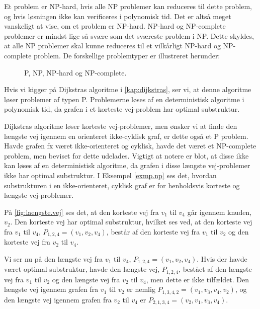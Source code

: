 Et problem er NP-hard, hvis alle NP problemer kan reduceres til dette problem, og hvis løsningen ikke kan verificeres i polynomisk tid. Det er altså meget vanskeligt at vise, om et problem er NP-hard. NP-hard og NP-complete problemer er mindst lige så svære som det sværeste problem i NP. Dette skyldes, at alle NP problemer skal kunne reduceres til et vilkårligt NP-hard og NP-complete problem.
De forskellige problemtyper er illustreret herunder:




\begin{figure}[H]
\centering
	\caption{P, NP, NP-hard og NP-complete.}
	\label{fig.dijkstraexmp}
\end{figure}

Hvis vi kigger på Dijkstras algoritme i \autoref{kap:dijkstras}, ser vi, at denne algoritme løser problemer af typen P. Problemerne løses af en deterministisk algoritme i polynomisk tid, da grafen i et korteste vej-problem har optimal substruktur.

Dijkstras algoritme løser korteste vej-problemer, men ønsker vi at finde den længste vej igennem en orienteret ikke-cyklisk graf, er dette også et P problem. Havde grafen fx været ikke-orienteret og cyklisk, havde det været et NP-complete problem, men beviset for dette udelades. Vigtigt at notere er blot, at disse ikke kan løses af en deterministisk algoritme, da grafen i disse længste vej-problemer ikke har optimal substruktur.
I Eksempel \ref{exmp.np} ses det, hvordan substrukturen i en ikke-orienteret, cyklisk graf er for henholdsvis korteste og længste vej-problemer.

\begin{exmp} \label{exmp.np}
På \autoref{fig:laengste.vej} ses det, at den korteste vej  fra $v_1$ til $v_4$ går igennem knuden, $v_2$. Den korteste vej har optimal substruktur, hvilket ses ved, at den korteste vej fra $v_{1}$ til $v_{4}$, $P_{1,2,4}=(v_{1},v_{2},v_{4})$, består af den korteste vej fra $v_{1}$ til $v_{2}$ og den korteste vej fra $v_{2}$ til $v_{4}$. 

Vi ser nu på den længste vej fra $v_1$ til $v_4$, $P_{1,2,4}=(v_{1},v_{2},v_{4})$. Hvis der havde været optimal substruktur, havde den længste vej, $P_{1,2,4}$, bestået af den længste vej fra $v_{1}$ til $v_{2}$ og den længste vej fra $v_{2}$ til $v_{4}$, men dette er ikke tilfældet. Den længste vej igennem grafen fra $v_{1}$ til $v_{2}$ er nemlig $P_{1,3,4,2}=(v_{1},v_{3},v_{4},v_{2})$, og den længste vej igennem grafen fra $v_{2}$ til $v_{4}$ er $P_{2,1,3,4}=(v_{2},v_{1},v_{3},v_{4})$. 






\end{exmp}


